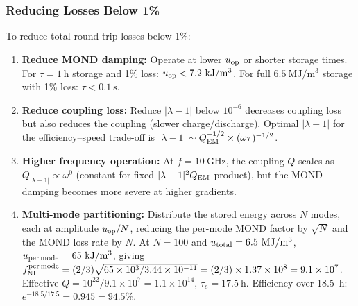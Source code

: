 \documentclass[aps,prd,twocolumn,superscriptaddress]{revtex4-2}
\newcommand{\lam}{|\lambda-1|}
\begin{document}
\subsubsection{Reducing Losses Below 1\%}

To reduce total round-trip losses below 1\%:

\begin{enumerate}
\item \textbf{Reduce MOND damping:} Operate at lower $u_{\rm op}$
or shorter storage times.  For $\tau = 1~\mathrm{h}$ storage and
1\% loss: $u_{\rm op} < 7.2~\mathrm{kJ/m^3}$.  For full
$6.5~\mathrm{MJ/m^3}$ storage with 1\% loss: $\tau < 0.1~\mathrm{s}$.

\item \textbf{Reduce coupling loss:} Reduce $\lam$ below $10^{-6}$
decreases coupling loss but also reduces the coupling (slower
charge/discharge).  Optimal $\lam$ for the efficiency--speed
trade-off is $\lam \sim Q_{\rm EM}^{-1/2}\times(\omega\tau)^{-1/2}$.

\item \textbf{Higher frequency operation:} At $f = 10~\mathrm{GHz}$,
the coupling $Q$ scales as $Q_\lam \propto \omega^0$ (constant for
fixed $\lam^2 Q_{\rm EM}$ product), but the MOND damping becomes more
severe at higher gradients.

\item \textbf{Multi-mode partitioning:} Distribute the stored energy
across $N$ modes, each at amplitude $u_{\rm op}/N$, reducing the
per-mode MOND factor by $\sqrt{N}$ and the MOND loss rate by $N$.
At $N = 100$ and $u_{\rm total} = 6.5~\mathrm{MJ/m^3}$,
$u_{\rm per\,mode} = 65~\mathrm{kJ/m^3}$, giving
$f_{\rm NL}^{\rm per\,mode} = (2/3)\sqrt{65\times 10^3/3.44\times 10^{-11}}
= (2/3)\times 1.37\times 10^8 = 9.1\times 10^7$.
Effective $Q = 10^{22}/9.1\times 10^7 = 1.1\times 10^{14}$,
$\tau_e = 17.5~\mathrm{h}$.  Efficiency over 18.5~h:
$e^{-18.5/17.5} = 0.945 = 94.5\%$.
\end{enumerate}
\end{document}
